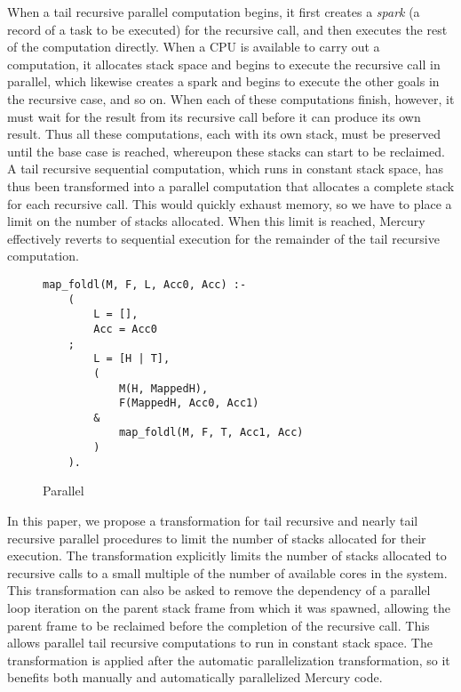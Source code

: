 When a tail recursive parallel computation begins, it
first creates a \emph{spark} (a record of a task to be executed) for
the recursive call,
and then executes the rest of the computation directly.
When a CPU is available to carry out a computation,
it allocates stack space and begins to execute the recursive call in
parallel, which likewise creates a spark and begins to execute the
other goals in the recursive case, and so on.
When each of these computations finish,
however, it must wait for the result from its recursive call
before it can produce its own result.
Thus all these computations, each with its own stack,
must be preserved until the base case is reached,
whereupon these stacks can start to be reclaimed.
A tail recursive sequential computation, which runs in constant stack space,
has thus been transformed into a parallel computation
that allocates a complete stack for each recursive call.
This would quickly exhaust memory,
so we have to place a limit on the number of stacks allocated.
When this limit is reached,
Mercury effectively reverts to sequential execution
for the remainder of the tail recursive computation.

\begin{figure}[tb]
\begin{verbatim}
map_foldl(M, F, L, Acc0, Acc) :-
    (
        L = [],
        Acc = Acc0
    ;
        L = [H | T],
        (
            M(H, MappedH),
            F(MappedH, Acc0, Acc1)
        &
            map_foldl(M, F, T, Acc1, Acc)
        )
    ).
\end{verbatim}
\caption{Parallel \mapfoldl{}}
\label{fig:mapfoldl}
\end{figure}

In this paper, we propose a transformation
for tail recursive and nearly tail recursive parallel procedures
to limit the number of stacks allocated for their execution.
The transformation explicitly limits
the number of stacks allocated to recursive calls
to a small multiple of the number of available cores in the system.
This transformation can also be asked
to remove the dependency of a parallel loop iteration
on the parent stack frame from which it was spawned,
allowing the parent frame to be reclaimed
before the completion of the recursive call.
This allows parallel tail recursive computations
to run in constant stack space.
The transformation is applied
after the automatic parallelization transformation,
so it benefits both manually and  automatically parallelized Mercury code.

